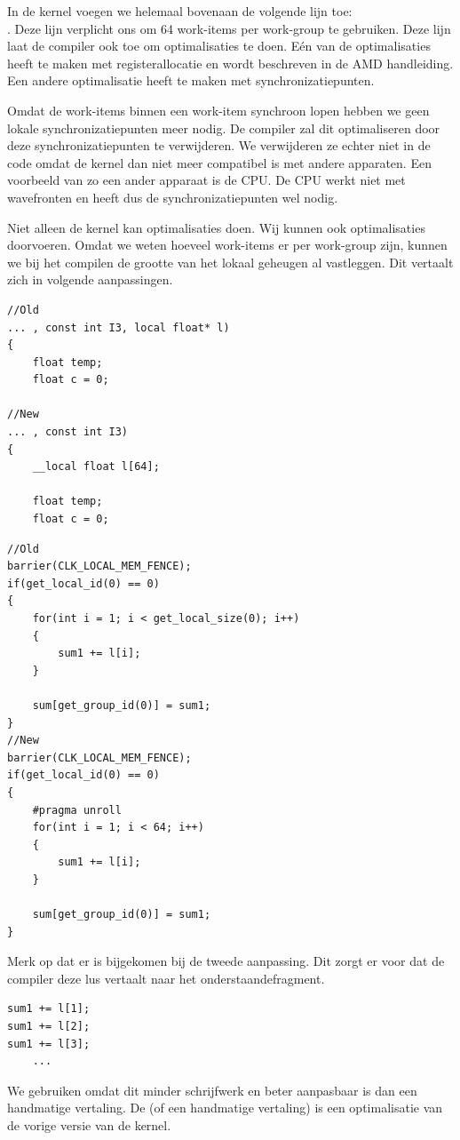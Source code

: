 In de kernel voegen we helemaal bovenaan de volgende lijn toe:\\ . Deze lijn verplicht ons om 64 work-items per work-group te gebruiken. Deze lijn laat de compiler ook toe om optimalisaties te doen. E\'en van de optimalisaties heeft te maken met registerallocatie en wordt beschreven in de AMD handleiding\cite[p.~6-27]{ amd}. Een andere optimalisatie heeft te maken met synchronizatiepunten.

Omdat de work-items binnen een work-item synchroon lopen hebben we geen lokale synchronizatiepunten meer nodig. De compiler zal dit optimaliseren door deze synchronizatiepunten te verwijderen. We verwijderen ze echter niet in de code omdat de kernel dan niet meer compatibel is met andere apparaten. Een voorbeeld van zo een ander apparaat is de CPU. De CPU werkt niet met wavefronten en heeft dus de synchronizatiepunten wel nodig.

Niet alleen de kernel kan optimalisaties doen. Wij kunnen ook optimalisaties doorvoeren. Omdat we weten hoeveel work-items er per work-group zijn, kunnen we bij het compilen de grootte van het lokaal geheugen al vastleggen. Dit vertaalt zich in volgende aanpassingen.

\begin{lstlisting}
//Old
... , const int I3, local float* l)
{
    float temp;
    float c = 0;

//New
... , const int I3)
{
    __local float l[64];
    
    float temp;
    float c = 0;
\end{lstlisting}
\begin{lstlisting}
//Old
barrier(CLK_LOCAL_MEM_FENCE);
if(get_local_id(0) == 0)
{        
    for(int i = 1; i < get_local_size(0); i++)
    {
        sum1 += l[i];
    }
    
    sum[get_group_id(0)] = sum1;
}
//New
barrier(CLK_LOCAL_MEM_FENCE);
if(get_local_id(0) == 0)
{        
    #pragma unroll
    for(int i = 1; i < 64; i++)
    {
        sum1 += l[i];
    }
    
    sum[get_group_id(0)] = sum1;
}
\end{lstlisting}

Merk op dat er  is bijgekomen bij de tweede aanpassing. Dit zorgt er voor dat de compiler deze lus vertaalt naar het onderstaandefragment. 
\begin{lstlisting}
sum1 += l[1];
sum1 += l[2];
sum1 += l[3];
    ...
\end{lstlisting}
We gebruiken  omdat dit minder schrijfwerk en beter aanpasbaar is dan een handmatige vertaling. De  (of een handmatige vertaling) is een optimalisatie van de vorige versie van de kernel.

